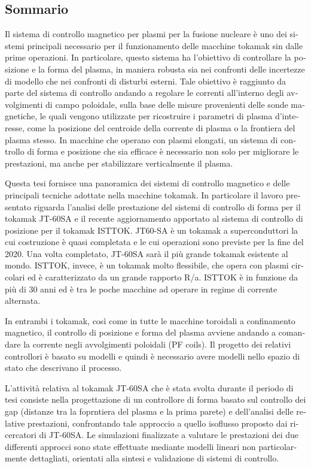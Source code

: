 \begin{otherlanguage}{italian}
\chapter*{Sommario}

Il sistema di controllo magnetico per plasmi per la fusione nucleare è uno dei sistemi principali necessario per il funzionamento delle macchine tokamak sin dalle prime operazioni. In particolare, questo sistema ha l’obiettivo di controllare la posizione e la forma del plasma, in maniera robusta sia nei confronti delle incertezze di modello che nei confronti di disturbi esterni. Tale obiettivo è raggiunto da parte del sistema di controllo andando a regolare le correnti all’interno degli avvolgimenti di campo poloidale, sulla base delle misure provenienti delle sonde magnetiche, le quali vengono utilizzate per ricostruire i parametri di plasma d’interesse, come la posizione del centroide della corrente di plasma o la frontiera del plasma stesso. In macchine che operano con plasmi elongati, un sistema di controllo di forma e posizione che sia efficace è necessario non solo per migliorare le prestazioni, ma anche per stabilizzare verticalmente il plasma.\smallskip

Questa tesi fornisce una panoramica dei sistemi di controllo magnetico e delle principali tecniche adottate nella macchine tokamak. In particolare il lavoro presentato riguarda l’analisi delle prestazione del sistemi di controllo di forma per il tokamak JT-60SA e il recente aggiornamento apportato al sistema di controllo di posizione per il tokamak ISTTOK. JT60-SA è un tokamak a superconduttori la cui costruzione è quasi completata e le cui operazioni sono previste per la fine del 2020. Una volta completato, JT-60SA sarà il più grande tokamak esistente al mondo. ISTTOK, invece, è un tokamak molto flessibile, che opera con plasmi circolari ed è caratterizzato da un grande rapporto R/a. ISTTOK è in funzione da più di 30 anni ed è tra le poche macchine ad operare in regime di corrente alternata.\smallskip

In entrambi i tokamak, così come in tutte le macchine toroidali a confinamento magnetico, il controllo di posizione e forma del plasma avviene andando a comandare la corrente negli avvolgimenti poloidali (PF coils). Il progetto dei relativi controllori è basato su modelli e quindi è necessario avere modelli nello spazio di stato che descrivano il processo.\smallskip

L’attività relativa al tokamak JT-60SA che è stata svolta durante il periodo di tesi consiste nella progettazione di un controllore di forma basato sul controllo dei gap (distanze tra la foprntiera del plasma e la prima parete) e dell’analisi delle relative prestazioni, confrontando tale approccio a quello isoflusso proposto dai ricercatori di JT-60SA. Le simulazioni finalizzate a valutare le prestazioni dei due differenti approcci sono state effettuate mediante modelli lineari non particolarmente dettagliati, orientati alla sintesi e validazione di sistemi di controllo.\smallskip


\end{otherlanguage}
